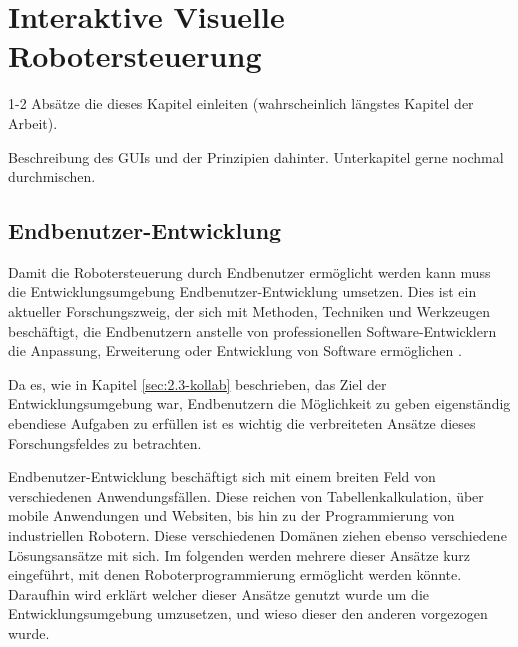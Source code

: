 \chapter{Interaktive Visuelle Robotersteuerung}\label{ch:interak-vis-roboterst} %
1-2 Absätze die dieses Kapitel einleiten (wahrscheinlich längstes Kapitel der Arbeit).

Beschreibung des GUIs und der Prinzipien dahinter. Unterkapitel gerne nochmal durchmischen.

\section{Endbenutzer-Entwicklung} %
Damit die Robotersteuerung durch Endbenutzer ermöglicht werden kann muss die Entwicklungsumgebung Endbenutzer-Entwicklung umsetzen. Dies ist ein aktueller Forschungszweig, der sich mit Methoden, Techniken und Werkzeugen beschäftigt, die Endbenutzern anstelle von professionellen Software-Entwicklern die Anpassung, Erweiterung oder Entwicklung von Software ermöglichen \cite{Lieberman2006EUDaEP}.

Da es, wie in Kapitel \ref{sec:2.3-kollab} beschrieben, das Ziel der Entwicklungsumgebung war, Endbenutzern die Möglichkeit zu geben eigenständig ebendiese Aufgaben zu erfüllen ist es wichtig die verbreiteten Ansätze dieses Forschungsfeldes zu betrachten.

Endbenutzer-Entwicklung beschäftigt sich mit einem breiten Feld von verschiedenen Anwendungsfällen. Diese reichen von Tabellenkalkulation, über mobile Anwendungen und Websiten, bis hin zu der Programmierung von industriellen Robotern. Diese verschiedenen Domänen ziehen ebenso verschiedene Lösungsansätze mit sich. Im folgenden werden mehrere dieser Ansätze kurz eingeführt, mit denen Roboterprogrammierung ermöglicht werden könnte. Daraufhin wird erklärt welcher dieser Ansätze genutzt wurde um die Entwicklungsumgebung umzusetzen, und wieso dieser den anderen vorgezogen wurde. %

